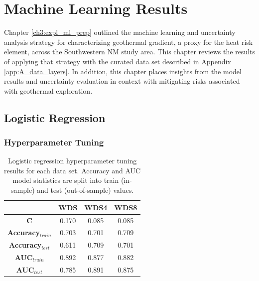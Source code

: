 \chapter{Machine Learning Results}\label{ch5:ml_results}

Chapter \ref{ch3:expl_ml_prep} outlined the machine learning and uncertainty analysis strategy for characterizing geothermal gradient, a proxy for the heat risk element, across the Southwestern NM study area. This chapter reviews the results of applying that strategy with the curated data set described in Appendix \ref{app:A_data_layers}. In addition, this chapter places insights from the model results and uncertainty evaluation in context with mitigating risks associated with geothermal exploration.

\section{Logistic Regression} \label{ch5:lr_model}
\subsection{Hyperparameter Tuning} \label{ch5:lr_tuning}
\begin{table}
\centering
\begin{tabular}{c|c|c|c|}
\cline{2-4}
                                 & \textbf{WDS}   & \textbf{WDS4}  & \textbf{WDS8}  \\ \hline
\multicolumn{1}{|c|}{\textbf{C}}          & 0.170 & 0.085 & 0.085 \\ \hline
\multicolumn{1}{|c|}{\textbf{Accuracy$_{train}$}} & 0.703 & 0.701 & 0.709 \\ \hline
\multicolumn{1}{|c|}{\textbf{Accuracy$_{test}$}}  & 0.611 & 0.709 & 0.701 \\ \hline
\multicolumn{1}{|c|}{\textbf{AUC$_{train}$}} & 0.892 & 0.877 & 0.882 \\ \hline
\multicolumn{1}{|c|}{\textbf{AUC$_{test}$}}  & 0.785 & 0.891 & 0.875 \\ \hline
\end{tabular}
\singlespacing
\caption[Logistic regression hyperparameter tuning results]{Logistic regression hyperparameter tuning results for each data set. Accuracy and AUC model statistics are split into train (in-sample) and test (out-of-sample) values.}
\label{tab:logreg_tuning}
\end{table}

